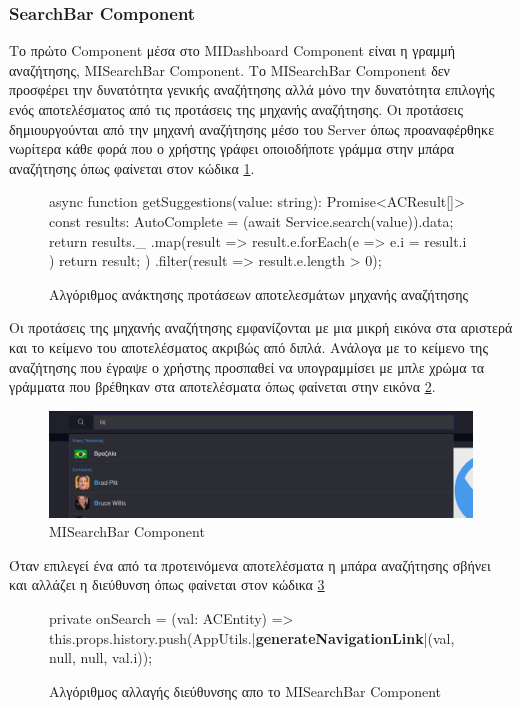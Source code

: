 \subsubsection{SearchBar Component}
Το πρώτο Component μέσα στο MIDashboard Component είναι η γραμμή αναζήτησης, MISearchBar Component. Το MISearchBar Component δεν προσφέρει την δυνατότητα γενικής αναζήτησης αλλά μόνο την δυνατότητα επιλογής ενός αποτελέσματος από τις προτάσεις της μηχανής αναζήτησης. Οι προτάσεις δημιουργούνται από την μηχανή αναζήτησης μέσο του Server όπως προαναφέρθηκε νωρίτερα κάθε φορά που ο χρήστης γράφει οποιοδήποτε γράμμα στην μπάρα αναζήτησης όπως φαίνεται στον κώδικα \ref{code:searchbar_suggestion}.

\begin{figure}[H]
    \begin{TypeScriptcode}
async function getSuggestions(value: string): Promise<ACResult[]> {
    const results: AutoComplete = (await Service.search(value)).data;
    return results._
      .map(result => {
        result.e.forEach(e => {
          e.i = result.i
        })
        return result;
      })
      .filter(result => result.e.length > 0);
}
    \end{TypeScriptcode}
    \caption{Αλγόριθμος ανάκτησης προτάσεων αποτελεσμάτων μηχανής αναζήτησης}
   \label{code:searchbar_suggestion}
\end{figure}

Οι προτάσεις της μηχανής αναζήτησης εμφανίζονται με μια μικρή εικόνα στα αριστερά και το κείμενο του αποτελέσματος ακριβώς από διπλά. Ανάλογα με το κείμενο της αναζήτησης που έγραψε ο χρήστης προσπαθεί να υπογραμμίσει με μπλε χρώμα τα γράμματα που βρέθηκαν στα αποτελέσματα όπως φαίνεται στην εικόνα \ref{layout:misearchbar}.
\begin{figure}[H]
  \centering
  \includegraphics[width=145mm]{Chapters/5 - Architecture/Client/Images/misearchbar_results.png}
  \caption{MISearchBar Component}
  \label{layout:misearchbar}
\end{figure}
Όταν επιλεγεί ένα από τα προτεινόμενα αποτελέσματα η μπάρα αναζήτησης σβήνει και αλλάζει η διεύθυνση όπως φαίνεται στον κώδικα \ref{code:searchbar_urlchange}

\begin{figure}[H]
    \begin{TypeScriptcode}
private onSearch = (val: ACEntity) => {
  this.props.history.push(AppUtils.|\textbf{generateNavigationLink}|(val, null, null, val.i));
}
    \end{TypeScriptcode}
    \caption{Αλγόριθμος αλλαγής διεύθυνσης απο το MISearchBar Component}
   \label{code:searchbar_urlchange}
\end{figure}
